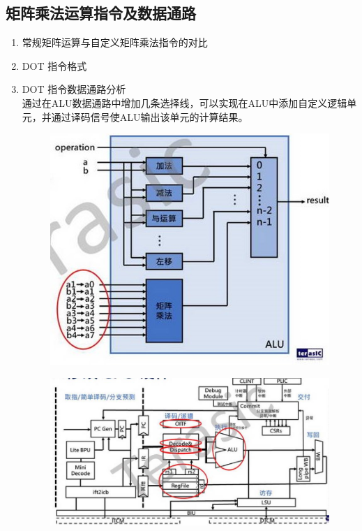 \documentclass[a4paper, 14pt, oneside]{book} %
\numberwithin{equation}{subsection}
\begin{document}
		\subsection{矩阵乘法运算指令及数据通路}
		\begin{enumerate}
			\item 常规矩阵运算与自定义矩阵乘法指令的对比 \\
			
			\item DOT 指令格式 \\
			
			
			\item DOT 指令数据通路分析 \\
			通过在ALU数据通路中增加几条选择线，可以实现在ALU中添加自定义逻辑单元，并通过译码信号使ALU输出该单元的计算结果。
			\begin{figure}[!htbp]
				\centering
				\includegraphics[scale=1]{img/alu2.png}
			\end{figure}
			\begin{figure}[!htbp]
				\centering
				\includegraphics[scale=0.8]{img/datalink.jpg}

\end{figure}
\end{enumerate}
\end{document}
